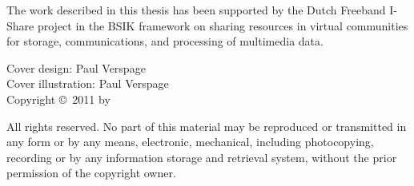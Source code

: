 \noindent The work described in this thesis has been supported by the Dutch Freeband I-Share project in the BSIK framework on sharing resources in virtual communities for storage, communications, and processing of multimedia data.

Cover design: Paul Verspage \\
Cover illustration: Paul Verspage \\

Copyright \copyright\ 2011 by \getauthor

All rights reserved. No part of this material may be reproduced or
transmitted in any form or by any means, electronic, mechanical,
including photocopying, recording or by any information storage and
retrieval system, without the prior permission of the copyright owner.

\endgroup

